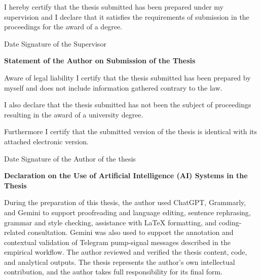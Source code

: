 \documentclass[12pt, a4paper]{report}
\begin{document}
\noindent I hereby certify that the thesis submitted has been prepared under my supervision and I declare that it satisfies the requirements of submission in the proceedings for the award of a degree.

\vspace{1.25cm}

\noindent Date \hfill Signature of the Supervisor

\vspace{1.45cm}

\noindent \textbf{Statement of the Author on Submission of the Thesis}

\vspace{0.45cm}

\noindent Aware of legal liability I certify that the thesis submitted has been prepared by myself and does not include information gathered contrary to the law.

\vspace{0.35cm}

\noindent I also declare that the thesis submitted has not been the subject of proceedings resulting in the award of a university degree.

\vspace{0.35cm}

\noindent Furthermore I certify that the submitted version of the thesis is identical with its attached electronic version.

\vspace{1.15cm}

\noindent Date \hfill Signature of the Author of the thesis

\vspace{1.2cm}

\noindent \textbf{Declaration on the Use of Artificial Intelligence (AI) Systems in the Thesis}

\vspace{0.45cm}

\noindent During the preparation of this thesis, the author used ChatGPT, Grammarly, and Gemini to support proofreading and language editing, sentence rephrasing, grammar and style checking, assistance with LaTeX formatting, and coding-related consultation. Gemini was also used to support the annotation and contextual validation of Telegram pump-signal messages described in the empirical workflow. The author reviewed and verified the thesis content, code, and analytical outputs. The thesis represents the author's own intellectual contribution, and the author takes full responsibility for its final form.
\end{document}
